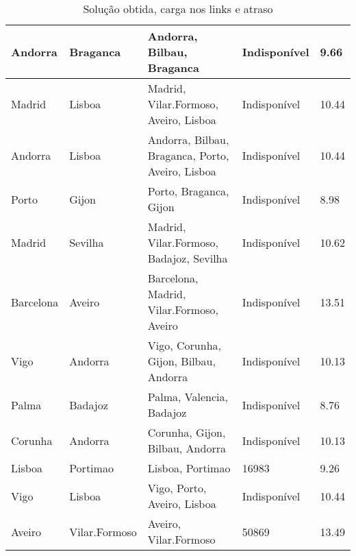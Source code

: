 \begin{table}[!htb]
{\begin{tabular}{|l|l|l|l|l|}
Andorra & Braganca & Andorra, Bilbau, Braganca & Indisponível & 9.66 \\ \hline
Madrid & Lisboa & Madrid, Vilar.Formoso, Aveiro, Lisboa & Indisponível & 10.44 \\ \hline
Andorra & Lisboa & Andorra, Bilbau, Braganca, Porto, Aveiro, Lisboa & Indisponível & 10.44 \\ \hline
Porto & Gijon & Porto, Braganca, Gijon & Indisponível & 8.98 \\ \hline
Madrid & Sevilha & Madrid, Vilar.Formoso, Badajoz, Sevilha & Indisponível & 10.62 \\ \hline
Barcelona & Aveiro & Barcelona, Madrid, Vilar.Formoso, Aveiro & Indisponível & 13.51 \\ \hline
Vigo & Andorra & Vigo, Corunha, Gijon, Bilbau, Andorra & Indisponível & 10.13 \\ \hline
Palma & Badajoz & Palma, Valencia, Badajoz & Indisponível & 8.76 \\ \hline
Corunha & Andorra & Corunha, Gijon, Bilbau, Andorra & Indisponível & 10.13 \\ \hline
Lisboa & Portimao & Lisboa, Portimao & 16983 & 9.26 \\ \hline
Vigo & Lisboa & Vigo, Porto, Aveiro, Lisboa & Indisponível & 10.44 \\ \hline
Aveiro & Vilar.Formoso & Aveiro, Vilar.Formoso & 50869 & 13.49 \\ \hline
\end{tabular}}
\caption[]{Solução obtida, carga nos links e atraso}
\end{table}

